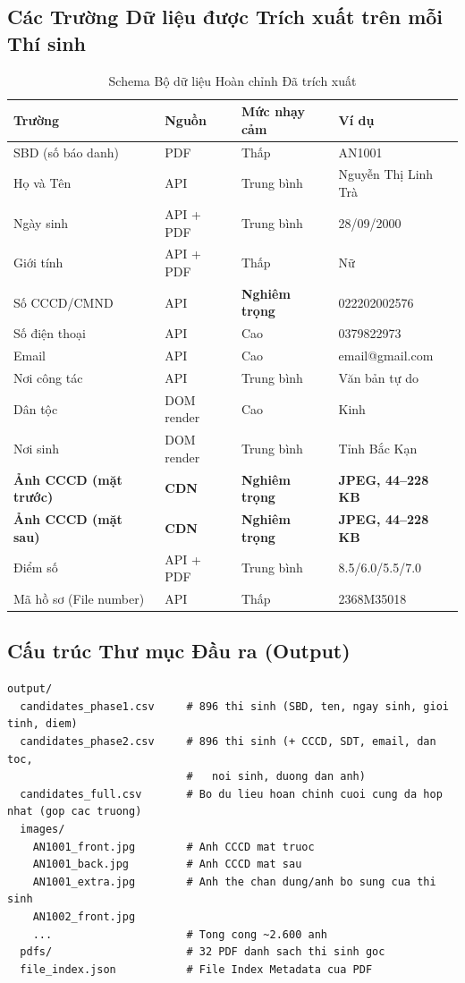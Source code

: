 \documentclass[12pt,a4paper]{article}
\begin{document}
\subsection{Các Trường Dữ liệu được Trích xuất trên mỗi Thí sinh}

\begin{table}[H]
\centering
\caption{Schema Bộ dữ liệu Hoàn chỉnh Đã trích xuất}
\begin{tabular}{@{}llll@{}}
\toprule
\textbf{Trường} & \textbf{Nguồn} & \textbf{Mức nhạy cảm} & \textbf{Ví dụ} \\
\midrule
SBD (số báo danh) & PDF & Thấp & AN1001 \\
Họ và Tên & API & Trung bình & Nguyễn Thị Linh Trà \\
Ngày sinh & API + PDF & Trung bình & 28/09/2000 \\
Giới tính & API + PDF & Thấp & Nữ \\
Số CCCD/CMND & API & \textbf{Nghiêm trọng} & 022202002576 \\
Số điện thoại & API & Cao & 0379822973 \\
Email & API & Cao & email@gmail.com \\
Nơi công tác & API & Trung bình & Văn bản tự do \\
Dân tộc & DOM render & Cao & Kinh \\
Nơi sinh & DOM render & Trung bình & Tỉnh Bắc Kạn \\
\textbf{Ảnh CCCD (mặt trước)} & \textbf{CDN} & \textbf{Nghiêm trọng} & \textbf{JPEG, 44--228 KB} \\
\textbf{Ảnh CCCD (mặt sau)} & \textbf{CDN} & \textbf{Nghiêm trọng} & \textbf{JPEG, 44--228 KB} \\
Điểm số & API + PDF & Trung bình & 8.5/6.0/5.5/7.0 \\
Mã hồ sơ (File number) & API & Thấp & 2368M35018 \\
\bottomrule
\end{tabular}
\end{table}

\subsection{Cấu trúc Thư mục Đầu ra (Output)}

\begin{lstlisting}[language={},title={Thư mục Đầu ra (Output Directory)}]
output/
  candidates_phase1.csv     # 896 thi sinh (SBD, ten, ngay sinh, gioi tinh, diem)
  candidates_phase2.csv     # 896 thi sinh (+ CCCD, SDT, email, dan toc,
                            #   noi sinh, duong dan anh)
  candidates_full.csv       # Bo du lieu hoan chinh cuoi cung da hop nhat (gop cac truong)
  images/
    AN1001_front.jpg        # Anh CCCD mat truoc
    AN1001_back.jpg         # Anh CCCD mat sau
    AN1001_extra.jpg        # Anh the chan dung/anh bo sung cua thi sinh
    AN1002_front.jpg
    ...                     # Tong cong ~2.600 anh
  pdfs/                     # 32 PDF danh sach thi sinh goc
  file_index.json           # File Index Metadata cua PDF
\end{lstlisting}
\end{document}
